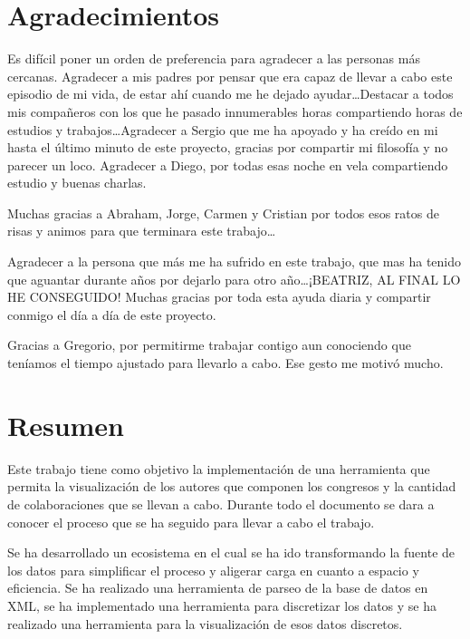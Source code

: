 \documentclass[a4paper, 12pt]{book}
\begin{document}
\chapter*{Agradecimientos}

Es difícil poner un orden de preferencia para agradecer a las personas más cercanas. Agradecer a mis padres por pensar que era capaz de llevar a cabo este episodio de mi vida, de estar ahí cuando me he dejado ayudar\ldots Destacar a todos mis compañeros con los que he pasado innumerables horas compartiendo horas de estudios y trabajos\ldots Agradecer a Sergio que me ha apoyado y ha creído en mi hasta el último minuto de este proyecto, gracias por compartir mi filosofía y no parecer un loco. Agradecer a Diego, por todas esas noche en vela compartiendo estudio y buenas charlas. 

Muchas gracias a Abraham, Jorge, Carmen y Cristian por todos esos ratos de risas y animos para que terminara este trabajo\ldots

Agradecer a la persona que más me ha sufrido en este trabajo, que mas ha tenido que aguantar durante años por dejarlo para otro año\ldots ¡BEATRIZ, AL FINAL LO HE CONSEGUIDO! Muchas gracias por toda esta ayuda diaria y compartir conmigo el día a día de este proyecto.

Gracias a Gregorio, por permitirme trabajar contigo aun conociendo que teníamos el tiempo ajustado para llevarlo a cabo. Ese gesto me motivó mucho.


\chapter*{Resumen}

Este trabajo tiene como objetivo la implementación de una herramienta que permita la visualización de los autores que componen los congresos y la cantidad de colaboraciones que se llevan a cabo. Durante todo el documento se dara a conocer el proceso que se ha seguido para llevar a cabo el trabajo.

Se ha desarrollado un ecosistema en el cual se ha ido transformando la fuente de los datos para simplificar el proceso y aligerar carga en cuanto a espacio y eficiencia. Se ha realizado una herramienta de parseo de la base de datos en XML, se ha implementado una herramienta para discretizar los datos y se ha realizado una herramienta para la visualización de esos datos discretos.
\end{document}
